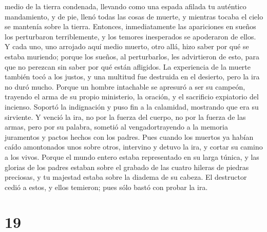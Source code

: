medio de la tierra condenada,  llevando como una espada
afilada tu auténtico mandamiento, y de pie, llenó todas las cosas de
muerte, y mientras tocaba el cielo se mantenía sobre la tierra.
 Entonces, inmediatamente las apariciones en sueños los
perturbaron terriblemente, y los temores inesperados se apoderaron de
ellos.  Y cada uno, uno arrojado aquí medio muerto, otro
allá, hizo saber por qué se estaba muriendo;  porque los
sueños, al perturbarlos, les advirtieron de esto, para que no perezcan
sin saber por qué están afligidos.  La experiencia de la
muerte también tocó a los justos, y una multitud fue destruida en el
desierto, pero la ira no duró mucho.  Porque un hombre
intachable se apresuró a ser su campeón, trayendo el arma de su propio
ministerio, la oración, y el sacrificio expiatorio del incienso. Soportó
la indignación y puso fin a la calamidad, mostrando que era su
sirviente.  Y venció la ira, no por la fuerza del cuerpo,
no por la fuerza de las armas, pero por su palabra, sometió al
vengadortrayendo a la memoria juramentos y pactos hechos con los padres.
 Pues cuando los muertos ya habían caído amontonados unos
sobre otros, intervino y detuvo la ira, y cortar su camino a los vivos.
 Porque el mundo entero estaba representado en su larga
túnica, y las glorias de los padres estaban sobre el grabado de las
cuatro hileras de piedras preciosas, y tu majestad estaba sobre la
diadema de su cabeza.  El destructor cedió a estos, y
ellos temieron; pues sólo bastó con probar la ira.

\hypertarget{section-18}{%
\section{19}\label{section-18}}


